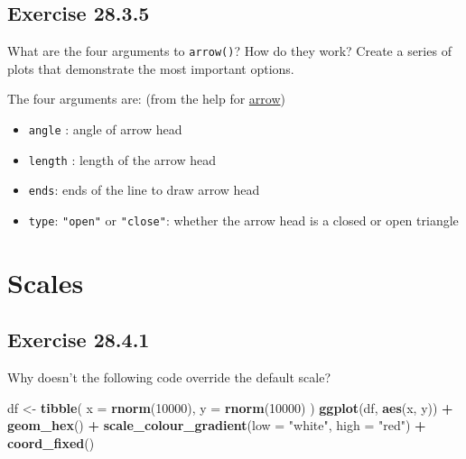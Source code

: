 \documentclass[]{book}
\newenvironment{Shaded}{\begin{snugshade}}{\end{snugshade}}
\newcommand{\DataTypeTok}[1]{\textcolor[rgb]{0.13,0.29,0.53}{#1}}
\newcommand{\DecValTok}[1]{\textcolor[rgb]{0.00,0.00,0.81}{#1}}
\newcommand{\KeywordTok}[1]{\textcolor[rgb]{0.13,0.29,0.53}{\textbf{#1}}}
\newcommand{\NormalTok}[1]{#1}
\newcommand{\OperatorTok}[1]{\textcolor[rgb]{0.81,0.36,0.00}{\textbf{#1}}}
\newcommand{\StringTok}[1]{\textcolor[rgb]{0.31,0.60,0.02}{#1}}
\providecommand{\tightlist}{%
  \setlength{\itemsep}{0pt}\setlength{\parskip}{0pt}}
\theoremstyle{plain}
\theoremstyle{remark}
\theoremstyle{definition}
\theoremstyle{definition}
\theoremstyle{definition}
\theoremstyle{remark}
\begin{document}
\hypertarget{exercise-28.3.5}{%
\subsection*{\texorpdfstring{Exercise
{28.3.5}}{Exercise 28.3.5}}\label{exercise-28.3.5}}

What are the four arguments to \texttt{arrow()}? How do they work?
Create a series of plots that demonstrate the most important options.

The four arguments are: (from the help for
\href{https://www.rdocumentation.org/packages/grid/versions/3.3.2/topics/arrow}{arrow})

\begin{itemize}
\tightlist
\item
  \texttt{angle} : angle of arrow head
\item
  \texttt{length} : length of the arrow head
\item
  \texttt{ends}: ends of the line to draw arrow head
\item
  \texttt{type}: \texttt{"open"} or \texttt{"close"}: whether the arrow
  head is a closed or open triangle
\end{itemize}

\hypertarget{scales}{%
\section{Scales}\label{scales}}

\hypertarget{exercise-28.4.1}{%
\subsection*{\texorpdfstring{Exercise
{28.4.1}}{Exercise 28.4.1}}\label{exercise-28.4.1}}

Why doesn't the following code override the default scale?

\begin{Shaded}
\begin{Highlighting}[]
\NormalTok{df <-}\StringTok{ }\KeywordTok{tibble}\NormalTok{(}
  \DataTypeTok{x =} \KeywordTok{rnorm}\NormalTok{(}\DecValTok{10000}\NormalTok{),}
  \DataTypeTok{y =} \KeywordTok{rnorm}\NormalTok{(}\DecValTok{10000}\NormalTok{)}
\NormalTok{)}
\KeywordTok{ggplot}\NormalTok{(df, }\KeywordTok{aes}\NormalTok{(x, y)) }\OperatorTok{+}
\StringTok{  }\KeywordTok{geom_hex}\NormalTok{() }\OperatorTok{+}
\StringTok{  }\KeywordTok{scale_colour_gradient}\NormalTok{(}\DataTypeTok{low =} \StringTok{"white"}\NormalTok{, }\DataTypeTok{high =} \StringTok{"red"}\NormalTok{) }\OperatorTok{+}
\StringTok{  }\KeywordTok{coord_fixed}\NormalTok{()}
\end{Highlighting}
\end{Shaded}
\end{document}
